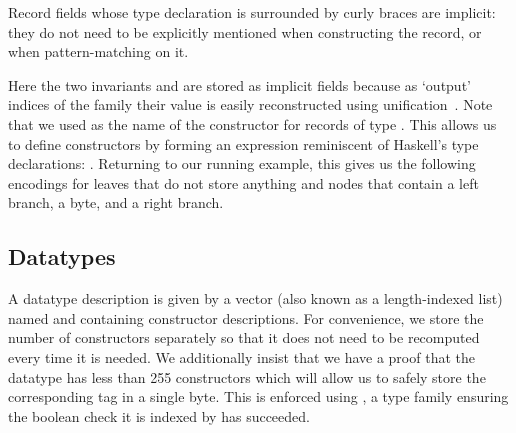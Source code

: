 
\begin{remark}
  Record fields whose type declaration is surrounded by
  curly braces are implicit: they do not need to be explicitly
  mentioned when constructing the record, or when pattern-matching
  on it.
\end{remark}

Here the two invariants  and
 are stored as implicit fields
because as `output' indices of the  family
their value is easily reconstructed using
unification~\citep{DBLP:conf/tlca/AbelP11}.
%
Note that we used \IdrisData{(::)} as the name of the
constructor for records of type .
This allows us to define constructors by forming an
expression reminiscent of Haskell's type declarations:
 \IdrisData{::} .
%
Returning to our running example, this gives us the following encodings for
leaves that do not store anything
and nodes that contain a left branch, a byte, and a right branch.

\noindent
\begin{minipage}[t]{.38\textwidth}
\end{minipage}\hfill
\begin{minipage}[t]{.58\textwidth}
\end{minipage}

\subsection{Datatypes}

A datatype description 
is given by a vector (also known as
a length-indexed list) named 
and containing constructor descriptions.
%
For convenience, we store the number 
of constructors separately so that it does not need to be
recomputed every time it is needed.
%
We additionally insist that we have a proof 
that the datatype has less than 255 constructors which will allow us
to safely store the corresponding tag in a single byte.
This is enforced using , a type
family ensuring the boolean check it is indexed by has succeeded.

\label{sec:datadescriptions}

